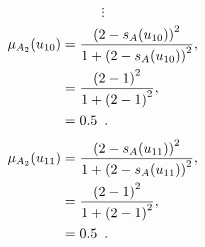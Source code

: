 \documentclass[a4paper,openany]{book}
\begin{document}
				\[
					\vdots
				\]
				\begin{align}
					\mu_{A_2}(u_{10}) &= \frac{\left(2-s_A(u_{10})\right)^2}{1 + \left(2-s_A(u_{10})\right)^2} ,\\
					&= \frac{\left(2-1\right)^2}{1 + \left(2-1\right)^2} \notag ,\\
					&= 0.5 \enspace. \notag
				\end{align}
				\begin{align}
					\mu_{A_2}(u_{11}) &= \frac{\left(2-s_A(u_{11})\right)^2}{1 + \left(2-s_A(u_{11})\right)^2} ,\\
					&= \frac{\left(2-1\right)^2}{1 + \left(2-1\right)^2} \notag ,\\
					&= 0.5 \enspace. \notag
				\end{align}
\end{document}
